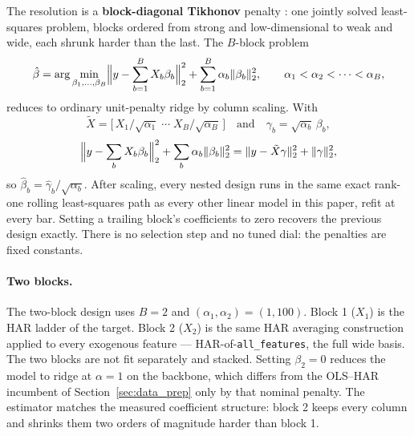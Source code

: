 The resolution is a \textbf{block-diagonal Tikhonov} penalty
\citep{HoerlKennard1970,vanWieringen2023ridge,vandeWiel2021multipenalty}:
one jointly solved least-squares problem, blocks ordered from strong
and low-dimensional to weak and wide, each shrunk harder than the
last. The $B$-block problem
\[
\hat\beta
= \arg\min_{\beta_1,\dots,\beta_B}
  \Bigl\lVert y - \sum_{b=1}^{B} X_b \beta_b \Bigr\rVert_2^2
  + \sum_{b=1}^{B} \alpha_b \lVert \beta_b \rVert_2^2,
\qquad
\alpha_1 < \alpha_2 < \cdots < \alpha_B,
\]
reduces to ordinary unit-penalty ridge by column scaling. With
\[
\tilde X = \bigl[\, X_1/\sqrt{\alpha_1} \;\cdots\; X_B/\sqrt{\alpha_B} \,\bigr]
\quad\mbox{and}\quad \gamma_b = \sqrt{\alpha_b}\,\beta_b,
\]
\[
\Bigl\lVert y - \sum_b X_b \beta_b \Bigr\rVert_2^2
+ \sum_b \alpha_b \lVert \beta_b \rVert_2^2
= \lVert y - \tilde X \gamma \rVert_2^2 + \lVert \gamma \rVert_2^2,
\]
so $\hat\beta_b = \hat\gamma_b / \sqrt{\alpha_b}$. After scaling, every
nested design runs in the same exact rank-one rolling
least-squares path as every other linear model in this paper, refit
at every bar. Setting a trailing block's coefficients to zero
recovers the previous design exactly. There is no selection step and
no tuned dial: the penalties are fixed constants.

\paragraph{Two blocks.}
The two-block design uses $B = 2$ and $(\alpha_1, \alpha_2) = (1, 100)$.
Block 1 ($X_1$) is the HAR ladder of the target. Block 2 ($X_2$) is
the same HAR averaging construction applied to every exogenous
feature --- HAR-of-\texttt{all\_features}, the full wide basis. The
two blocks are not fit separately and stacked. Setting
$\beta_2 = 0$ reduces the model to ridge at $\alpha = 1$ on the
backbone, which differs from the OLS--HAR incumbent of
Section~\ref{sec:data_prep} only by that nominal penalty. The
estimator matches the measured coefficient structure: block 2 keeps
every column and shrinks them two orders of magnitude harder than
block 1.

\label{sec:nonlinear_product}
\label{sec:product_block}
\iffalse
